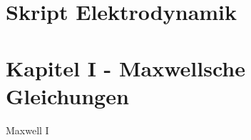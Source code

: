 \documentclass{article}
\begin{document}
\section*{Skript Elektrodynamik}



\section{Kapitel I - Maxwellsche Gleichungen}
Maxwell I
\end{document}
